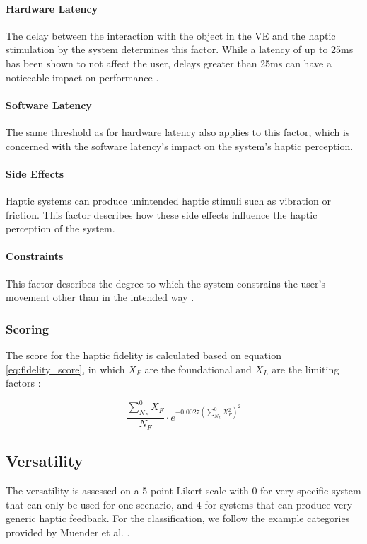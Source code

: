 \paragraph{Hardware Latency}
The delay between the interaction with the object in the VE and the haptic stimulation by the system determines this factor. While a latency of up to 25ms has been shown to not affect the user, delays greater than 25ms can have a noticeable impact on performance \cite{Muender2022HapticReality}.

\paragraph{Software Latency}
The same threshold as for hardware latency also applies to this factor, which is concerned with the software latency's impact on the system's haptic perception.

\paragraph{Side Effects}
Haptic systems can produce unintended haptic stimuli such as vibration or friction. This factor describes how these side effects influence the haptic perception of the system. 

\paragraph{Constraints}
This factor describes the degree to which the system constrains the user's movement other than in the intended way \cite{Muender2022HapticReality}.

\subsubsection{Scoring}

The score for the haptic fidelity is calculated based on equation \ref{eq:fidelity_score}, in which $X_F$ are the foundational and $X_L$ are the limiting factors \cite{Muender2022HapticReality}:

\begin{equation}
	\frac{\sum_{N_F}^{0} X_F}{N_F} \cdot e^{-0.0027 \left(\sum_{N_L}^{0} X_F^2 \right)^2}
	\label{eq:fidelity_score}
\end{equation}

\subsection{Versatility}
The versatility is assessed on a 5-point Likert scale with 0 for very specific system that can only be used for one scenario, and 4 for systems that can produce very generic haptic feedback. For the classification, we follow the example categories provided by Muender et al. \cite{Muender2022HapticReality}.


